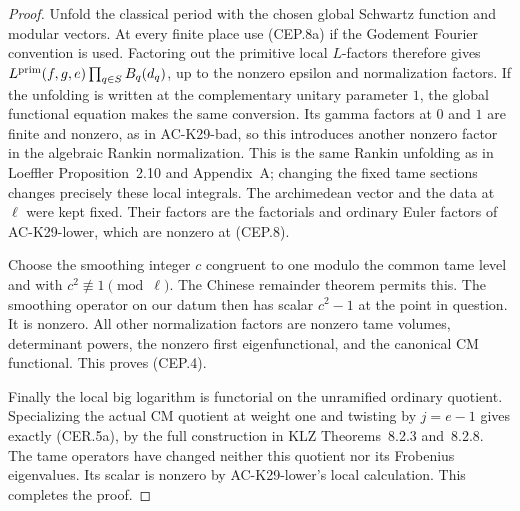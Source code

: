 \begin{proof}
Unfold the classical period with the chosen global
Schwartz function and modular vectors.  At every
finite place use (CEP.8a) if the Godement
Fourier convention is used.  Factoring out the primitive local
$L$-factors therefore gives
$L^{\rm prim}(f,g,e)\prod_{q\in S}B_q(d_q)$,
up to the nonzero epsilon and normalization factors.
If the unfolding is written at the complementary
unitary parameter $1$, the global functional
equation makes the same conversion.  Its gamma
factors at $0$ and $1$ are finite and nonzero,
as in AC-K29-bad, so this introduces another
nonzero factor in the algebraic Rankin normalization.
This is the same Rankin unfolding as in Loeffler
Proposition~2.10 and Appendix~A; changing the fixed
tame sections changes precisely these local
integrals.  The archimedean vector and the data at
$\ell$ were kept fixed.  Their factors are the
factorials and ordinary Euler factors of AC-K29-lower,
which are nonzero at (CEP.8).

Choose the smoothing integer $c$ congruent to one
modulo the common tame level and with
$c^2\not\equiv1\pmod\ell$.  The Chinese remainder
theorem permits this.  The smoothing operator on
our datum then has scalar $c^2-1$ at the point in
question.  It is nonzero.  All other normalization
factors are nonzero tame volumes, determinant powers,
the nonzero first eigenfunctional, and the canonical
CM functional.  This proves (CEP.4).

Finally the local big logarithm is functorial on
the unramified ordinary quotient.  Specializing the
actual CM quotient at weight one and twisting by
$j=e-1$ gives exactly (CER.5a), by the full construction
in KLZ Theorems~8.2.3 and~8.2.8.
The tame operators have changed neither this quotient
nor its Frobenius eigenvalues.  Its scalar is nonzero
by AC-K29-lower's local calculation.  This completes
the proof.
\end{proof}

